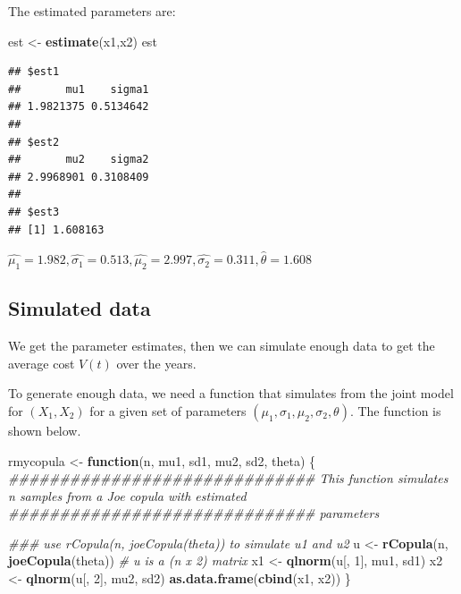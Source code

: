 \documentclass[11pt,]{article}
\newenvironment{Shaded}{\begin{snugshade}}{\end{snugshade}}
\newcommand{\CommentTok}[1]{\textcolor[rgb]{0.56,0.35,0.01}{\textit{#1}}}
\newcommand{\ControlFlowTok}[1]{\textcolor[rgb]{0.13,0.29,0.53}{\textbf{#1}}}
\newcommand{\DecValTok}[1]{\textcolor[rgb]{0.00,0.00,0.81}{#1}}
\newcommand{\KeywordTok}[1]{\textcolor[rgb]{0.13,0.29,0.53}{\textbf{#1}}}
\newcommand{\NormalTok}[1]{#1}
\newcommand{\StringTok}[1]{\textcolor[rgb]{0.31,0.60,0.02}{#1}}
\begin{document}
The estimated parameters are:

\begin{Shaded}
\begin{Highlighting}[]
\NormalTok{est <-}\StringTok{ }\KeywordTok{estimate}\NormalTok{(x1,x2)}
\NormalTok{est}
\end{Highlighting}
\end{Shaded}

\begin{verbatim}
## $est1
##       mu1    sigma1 
## 1.9821375 0.5134642 
## 
## $est2
##       mu2    sigma2 
## 2.9968901 0.3108409 
## 
## $est3
## [1] 1.608163
\end{verbatim}

\(\hat{\mu_{1}}=1.982, \hat{\sigma_{1}}=0.513,\hat{\mu_{2}}=2.997,\hat{\sigma_{2}}=0.311,\hat{\theta}=1.608\)

\hypertarget{simulated-data}{%
\subsection{Simulated data}\label{simulated-data}}

We get the parameter estimates, then we can simulate enough data to get
the average cost \(V(t)\) over the years.

To generate enough data, we need a function that simulates from the
joint model for \((X_1,X_2)\) for a given set of parameters
\((\mu_{1},\sigma_{1},\mu_{2},\sigma_{2},\theta)\). The function is
shown below.

\begin{Shaded}
\begin{Highlighting}[]
\NormalTok{rmycopula <-}\StringTok{ }\ControlFlowTok{function}\NormalTok{(n, mu1, sd1, mu2, sd2, theta) \{}
    \CommentTok{############################## This function simulates n samples from a Joe copula with estimated}
    \CommentTok{############################## parameters}
    
    \CommentTok{### use rCopula(n, joeCopula(theta)) to simulate u1 and u2}
\NormalTok{    u <-}\StringTok{ }\KeywordTok{rCopula}\NormalTok{(n, }\KeywordTok{joeCopula}\NormalTok{(theta))  }\CommentTok{# u is a (n x 2) matrix}
\NormalTok{    x1 <-}\StringTok{ }\KeywordTok{qlnorm}\NormalTok{(u[, }\DecValTok{1}\NormalTok{], mu1, sd1)}
\NormalTok{    x2 <-}\StringTok{ }\KeywordTok{qlnorm}\NormalTok{(u[, }\DecValTok{2}\NormalTok{], mu2, sd2)}
    \KeywordTok{as.data.frame}\NormalTok{(}\KeywordTok{cbind}\NormalTok{(x1, x2))}
\NormalTok{\}}
\end{Highlighting}
\end{Shaded}
\end{document}
